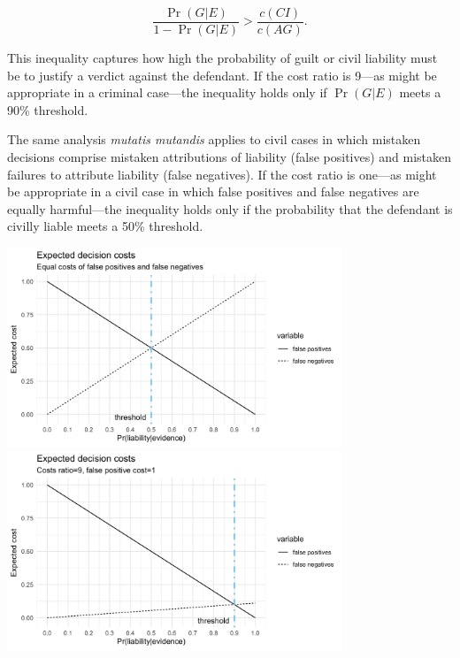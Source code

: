 \documentclass[10pt,dvipsnames]{scrartcl}
\begin{document}
\[ \frac{\Pr(G|E)}{1- \Pr(G|E)} > \frac{c(CI)}{c(AG)}.\]

This inequality captures how high the probability of guilt or civil
liability must be to justify a verdict against the defendant. If the
cost ratio is 9---as might be appropriate in a criminal case---the
inequality holds only if \(\Pr(G | E)\) meets a 90\% threshold.

The same analysis \textit{mutatis mutandis} applies to civil cases in
which mistaken decisions comprise mistaken attributions of liability
(false positives) and mistaken failures to attribute liability (false
negatives). If the cost ratio is one---as might be appropriate in a
civil case in which false positives and false negatives are equally
harmful---the inequality holds only if the probability that the
defendant is civilly liable meets a 50\% threshold.

\begin{center}
\includegraphics[width=10cm]{civil2.png}
\includegraphics[width=10cm]{criminal4.png}   
\end{center}
\end{document}
